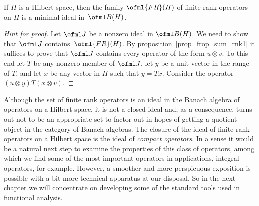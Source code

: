 \begin{prop} If $H$ is a Hilbert space, then the family $\ofml{FR}(H)$ of finite rank operators on $H$
is a minimal ideal in~$\ofml B(H)$.
\end{prop}

\begin{proof}[\emph{Hint for proof}] Let $\ofml J$ be a nonzero ideal in $\ofml B(H)$.  We need to show that $\ofml J$
contains~$\ofml{FR}(H)$.  By proposition~\ref{prop_frop_sum_rnk1} it suffices to prove that $\ofml J$ contains every
operator of the form $u \otimes v$.  To this end let $T$ be any nonzero member of $\ofml J$, let $y$ be a unit vector in
the range of $T$, and let $x$ be any vector in $H$ such that $y = Tx$.  Consider the operator $(u \otimes y)T(x \otimes v)$. \ns
\end{proof}

Although the set of finite rank operators is an ideal in the Banach algebra of operators on a Hilbert space, it is not a closed
ideal and, as a consequence, turns out not to be an appropriate set to factor out in hopes of getting a quotient object in the
category of Banach algebras.  The closure of the ideal of finite rank operators on a Hilbert space is the ideal of \emph{compact
operators}.  In a sense it would be a natural next step to examine the properties of this class of operators, among which we find
some of the most important operators in applications, integral operators, for example.  However, a smoother and more perspicuous
exposition is possible with a bit more technical apparatus at our disposal.  So in the next chapter we will concentrate on
developing some of the standard tools used in functional analysis.
























\endinput
